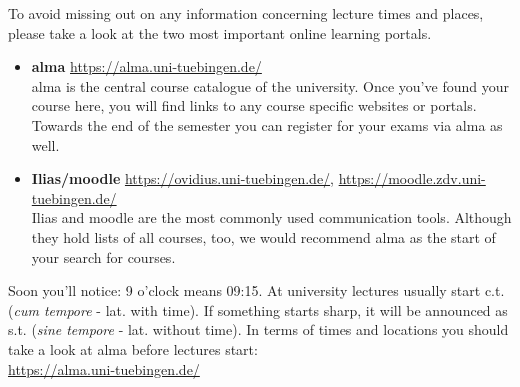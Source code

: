 To avoid missing out on any information concerning lecture times and places, please take a look at the two most important online learning portals.
\begin{itemize}
	\item \textbf{alma} \url{https://alma.uni-tuebingen.de/} \\
	alma is the central course catalogue of the university. Once you've found your course here, you will find links to any course specific websites or portals.
	Towards the end of the semester you can register for your exams via alma as well.
	\item \textbf{Ilias/moodle} \url{https://ovidius.uni-tuebingen.de/}, \url{https://moodle.zdv.uni-tuebingen.de/} \\
	Ilias and moodle are the most commonly used communication tools. Although they hold lists of all courses, too, we would recommend alma as the start of your search for courses.
\end{itemize}

Soon you'll notice: 9 o'clock means 09:15. At university lectures usually start c.t. (\textit{cum
tempore} - lat. with time). If something starts \glqq sharp\grqq, it will be announced as s.t. (\textit{sine tempore} - lat. without
time). In terms of times and locations you should take a look at alma before lectures start:\\
\url{https://alma.uni-tuebingen.de/} \\ \\
